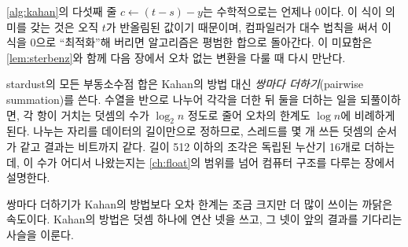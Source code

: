 \cref{alg:kahan}의 다섯째 줄 $c\gets(t-s)-y$는 수학적으로는 언제나 $0$이다. 이 식이 의미를 갖는 것은 오직 $t$가 반올림된 값이기 때문이며, 컴파일러가 대수 법칙을 써서 이 식을 $0$으로 ``최적화''해 버리면 알고리즘은 평범한 합으로 돌아간다. 이 미묘함은 \cref{lem:sterbenz}와 함께 다음 장에서 오차 없는 변환을 다룰 때 다시 만난다.

\begin{instardust}
stardust의 모든 부동소수점 합은 Kahan의 방법 대신 \emph{쌍마다 더하기}(pairwise summation)를 쓴다. 수열을 반으로 나누어 각각을 더한 뒤 둘을 더하는 일을 되풀이하면, 각 항이 거치는 덧셈의 수가 $\log_2 n$ 정도로 줄어 오차의 한계도 $\log n$에 비례하게 된다. 나누는 자리를 데이터의 길이만으로 정하므로, 스레드를 몇 개 쓰든 덧셈의 순서가 같고 결과는 비트까지 같다. 길이 512 이하의 조각은 독립된 누산기 16개로 더하는데, 이 수가 어디서 나왔는지는 \cref{ch:float}의 범위를 넘어 컴퓨터 구조를 다루는 장에서 설명한다.
\end{instardust}

\begin{remark}
쌍마다 더하기가 Kahan의 방법보다 오차 한계는 조금 크지만 더 많이 쓰이는 까닭은 속도이다. Kahan의 방법은 덧셈 하나에 연산 넷을 쓰고, 그 넷이 앞의 결과를 기다리는 사슬을 이룬다.
\end{remark}

